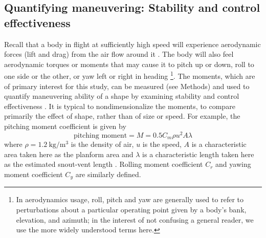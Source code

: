 \subsection{Quantifying maneuvering: Stability and control effectiveness}
Recall that a body in flight at sufficiently high speed will experience aerodynamic forces (lift and drag) from the air flow around it \cite{McCormick:1995, Etkin:1996}.  The body will also feel aerodynamic torques or moments that may cause it to pitch up or down, roll to one side or the other, or yaw left or right in heading \footnote{In aerodynamics usage, roll, pitch and yaw are generally used to refer to perturbations about a particular operating point given by a body's bank, elevation, and azimuth; in the interest of not confusing a general reader, we use the more widely understood terms here.}.  The moments, which are of primary interest for this study, can be measured (see Methods) and used to quantify maneuvering ability of a shape by examining stability and control effectiveness \cite{McCormick:1995, Etkin:1996, McCay:2001, McCay:2001a, plos:part1}.  It is typical to nondimensionalize the moments, to compare primarily the effect of shape, rather than of size or speed.  For example, the pitching moment coefficient is given by
\begin{equation}
\mbox{pitching moment} = M = \num{0.5} C_m \rho u^2 A \lambda
\end{equation}
where $\rho=\SI{1.2}{\kilo\gram\per\meter\cubed}$ is the density of air, $u$ is the speed, $A$ is a characteristic area taken here as the planform area and $\lambda$ is a characteristic length taken here as the estimated snout-vent length \cite{McCay:2001, McCay:2001a, Koehl:2011}. Rolling moment coefficient $C_r$ and yawing moment coefficient $C_y$ are similarly defined.

